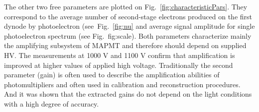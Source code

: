 The other two free parameters are plotted on Fig.~\ref{fig:characteristicPars}.
They correspond to the average number of second-stage electrons produced on the first dynode by photoelectron (see~Fig.~\ref{fig:nu} and average signal amplitude for single photoelectron spectrum (see Fig.~{fig:scale}).
Both parameters characterize mainly the amplifying subsystem of MAPMT and therefore should depend on supplied HV.
The measurements at 1000 V and 1100 V confirm that amplification is improved at higher values of applied high voltage.
Traditionally the second parameter (gain) is often used to describe the amplification abilities of photomultipliers and often used in calibration and reconstruction procedures.
And it was shown that the extracted gains do not depend on the light conditions with a high degree of accuracy.
\fi
